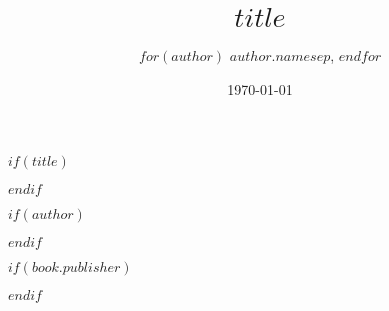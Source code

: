 \documentclass[
  a4paper, %
  fontsize=10pt, %
  twoside=true, %
  numbers=noenddot, %
]{kaobook}
\begin{document}


$if(title)$
\title[$title$]{$title$}
$endif$

$if(author)$
\author[]{$for(author)$
    $author.name$$sep$, $endfor$}
$endif$
\date{\today}

$if(book.publisher)$
\publishers{$book.publisher$}
$endif$

\frontmatter %




\makeatletter
\uppertitleback{\@titlehead} %
\end{document}
